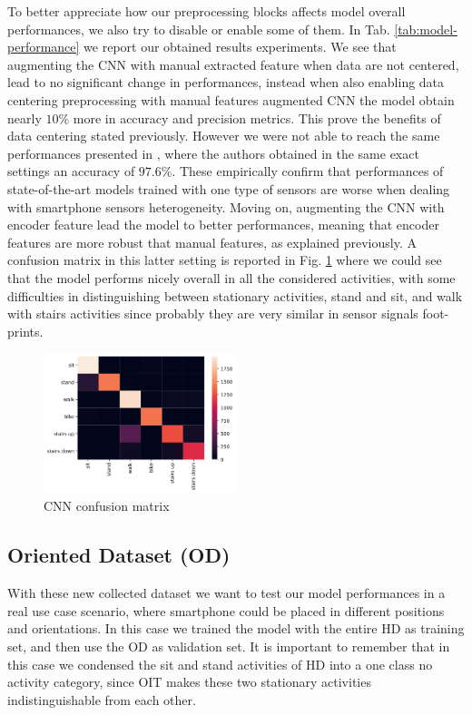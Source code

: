 To better appreciate how our preprocessing blocks affects model overall performances, we also try to disable or enable some of them. In Tab. \ref{tab:model-performance} we report our obtained results experiments. We see that augmenting the CNN with manual extracted feature when data are not centered, lead to no significant change in performances, instead when also enabling data centering preprocessing with manual features augmented CNN the model obtain nearly $10\%$ more in accuracy and precision metrics. This prove the benefits of data centering stated previously. However we were not able to reach the same performances presented in \cite{ignatov2018real}, where the authors obtained in the same exact settings an accuracy of $97.6\%$. These empirically confirm that performances of state-of-the-art models trained with one type of sensors are worse when dealing with smartphone sensors heterogeneity. Moving on, augmenting the CNN with encoder feature lead the model to better performances, meaning that encoder features are more robust that manual features, as explained previously. A confusion matrix in this latter setting is reported in Fig. \ref{fig:cnn-confusion-matrix} where we could see that the model performs nicely overall in all the considered activities, with some difficulties in distinguishing between stationary activities, stand and sit, and walk with stairs activities since probably they are very similar in sensor signals foot-prints.

\begin{figure}[h]
	\centering
	\includegraphics[width=0.5\textwidth]{images/confusion_matrix.png}
	\caption{CNN confusion matrix}
	\label{fig:cnn-confusion-matrix}
\end{figure}


\subsection{Oriented Dataset (OD)}

With these new collected dataset we want to test our model
performances in a real use case scenario, where smartphone could be
placed in different positions and orientations. In this case we
trained the model with the entire HD as training set, and then use the
OD as validation set. It is important to remember that in this case we condensed the sit and stand activities of HD into a one class no activity category, since OIT makes these two stationary activities indistinguishable from each other.

